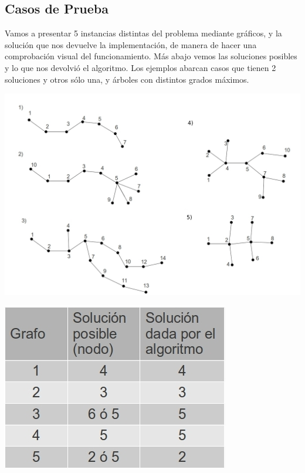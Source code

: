 \subsection{Casos de Prueba}

Vamos a presentar 5 instancias distintas del problema mediante gráficos, y la solución que nos devuelve la implementación, de manera de hacer una comprobación visual del funcionamiento. Más abajo vemos las soluciones posibles y lo que nos devolvió el algoritmo.
Los ejemplos abarcan casos que tienen 2 soluciones y otros sólo una, y árboles con distintos grados máximos.

\begin{center}
\includegraphics[scale=0.5]{ej2/2/graficos/imagen05.jpg} 
\end{center}

\begin{center}
\includegraphics[scale=0.5]{ej2/2/graficos/imagen06.jpg} 
\end{center}